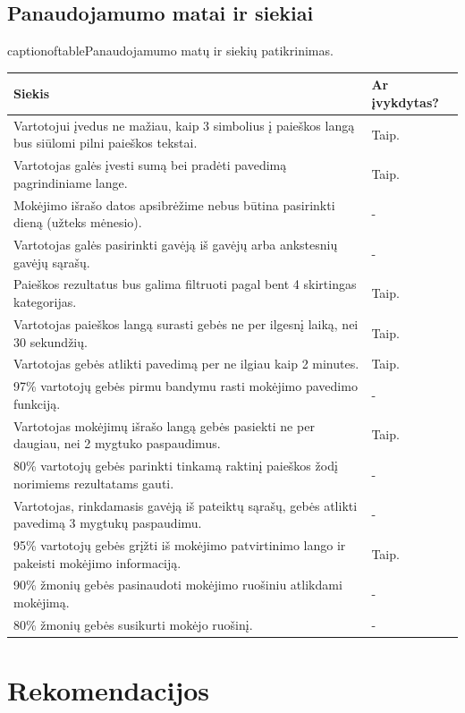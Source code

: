 \documentclass[oneside]{VUMIFPSkursinis}
\begin{document}
\subsection{Panaudojamumo matai ir siekiai}
\begin{center}
	captionof{table}{Panaudojamumo matų ir siekių patikrinimas.}
    \begin{tabular}{ |p{12cm}| p{3cm} |}
    \hline
	Siekis & Ar įvykdytas? \\ \hline
	Vartotojui įvedus ne mažiau, kaip 3 simbolius į paieškos langą bus siūlomi pilni paieškos tekstai. & Taip. \\ \hline
	Vartotojas galės įvesti sumą bei pradėti pavedimą pagrindiniame lange. & Taip. \\ \hline
	Mokėjimo išrašo datos apsibrėžime nebus būtina pasirinkti dieną (užteks mėnesio). & - \\ \hline
	Vartotojas galės pasirinkti gavėją iš gavėjų arba ankstesnių gavėjų sąrašų. & - \\ \hline
	Paieškos rezultatus bus galima filtruoti pagal bent 4 skirtingas kategorijas. & Taip. \\ \hline
	Vartotojas paieškos langą surasti gebės ne per ilgesnį laiką, nei 30 sekundžių. & Taip. \\ \hline
	Vartotojas gebės atlikti pavedimą per ne ilgiau kaip 2 minutes. & Taip. \\ \hline
	97\% vartotojų gebės pirmu bandymu rasti mokėjimo pavedimo funkciją. & - \\ \hline
	Vartotojas mokėjimų išrašo langą gebės pasiekti ne per daugiau, nei 2 mygtuko paspaudimus. & Taip. \\ \hline
	80\% vartotojų gebės parinkti tinkamą raktinį paieškos žodį norimiems rezultatams gauti. & - \\ \hline
	Vartotojas, rinkdamasis gavėją iš pateiktų sąrašų, gebės atlikti pavedimą 3 mygtukų paspaudimu. & - \\ \hline
	95\% vartotojų gebės grįžti iš mokėjimo patvirtinimo lango ir pakeisti mokėjimo informaciją. & Taip. \\ \hline
	90\% žmonių gebės pasinaudoti mokėjimo ruošiniu atlikdami mokėjimą. & - \\ \hline
	80\% žmonių gebės susikurti mokėjo ruošinį. & - \\ \hline

    \end{tabular}
\end{center}
\section{Rekomendacijos}
\end{document}

